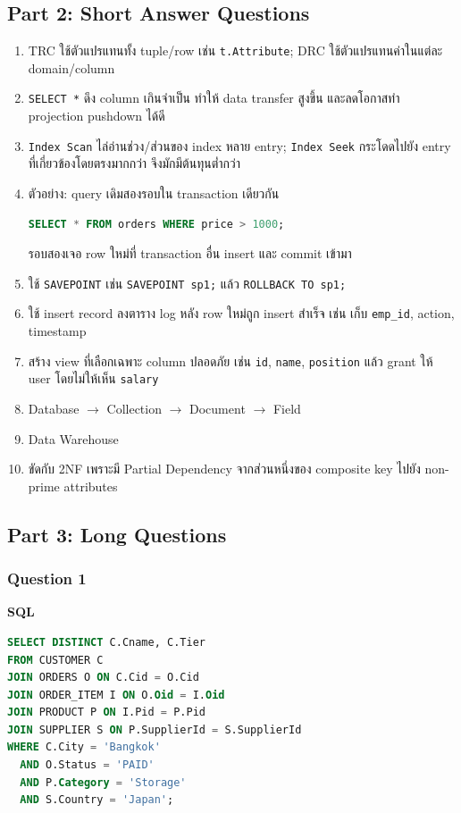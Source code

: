 \documentclass[a4paper,12pt]{article}
\begin{document}
\subsection*{Part 2: Short Answer Questions}
\begin{enumerate}[label=\textbf{\arabic*.}]
    \item TRC ใช้ตัวแปรแทนทั้ง tuple/row เช่น \texttt{t.Attribute}; DRC ใช้ตัวแปรแทนค่าในแต่ละ domain/column
    \item \texttt{SELECT *} ดึง column เกินจำเป็น ทำให้ data transfer สูงขึ้น และลดโอกาสทำ projection pushdown ได้ดี
    \item \texttt{Index Scan} ไล่อ่านช่วง/ส่วนของ index หลาย entry; \texttt{Index Seek} กระโดดไปยัง entry ที่เกี่ยวข้องโดยตรงมากกว่า จึงมักมีต้นทุนต่ำกว่า
    \item ตัวอย่าง: query เดิมสองรอบใน transaction เดียวกัน
\begin{lstlisting}[language=SQL,numbers=none]
SELECT * FROM orders WHERE price > 1000;
\end{lstlisting}
    รอบสองเจอ row ใหม่ที่ transaction อื่น insert และ commit เข้ามา
    \item ใช้ \texttt{SAVEPOINT} เช่น \texttt{SAVEPOINT sp1;} แล้ว \texttt{ROLLBACK TO sp1;}
    \item ใช้ insert record ลงตาราง log หลัง row ใหม่ถูก insert สำเร็จ เช่น เก็บ \texttt{emp\_id}, action, timestamp
    \item สร้าง view ที่เลือกเฉพาะ column ปลอดภัย เช่น \texttt{id}, \texttt{name}, \texttt{position} แล้ว grant ให้ user โดยไม่ให้เห็น \texttt{salary}
    \item Database $\rightarrow$ Collection $\rightarrow$ Document $\rightarrow$ Field
    \item Data Warehouse
    \item ขัดกับ 2NF เพราะมี Partial Dependency จากส่วนหนึ่งของ composite key ไปยัง non-prime attributes
\end{enumerate}

\newpage
\subsection*{Part 3: Long Questions}

\subsubsection*{Question 1}
\textbf{SQL}
\begin{lstlisting}[language=SQL]
SELECT DISTINCT C.Cname, C.Tier
FROM CUSTOMER C
JOIN ORDERS O ON C.Cid = O.Cid
JOIN ORDER_ITEM I ON O.Oid = I.Oid
JOIN PRODUCT P ON I.Pid = P.Pid
JOIN SUPPLIER S ON P.SupplierId = S.SupplierId
WHERE C.City = 'Bangkok'
  AND O.Status = 'PAID'
  AND P.Category = 'Storage'
  AND S.Country = 'Japan';
\end{lstlisting}
\end{document}
